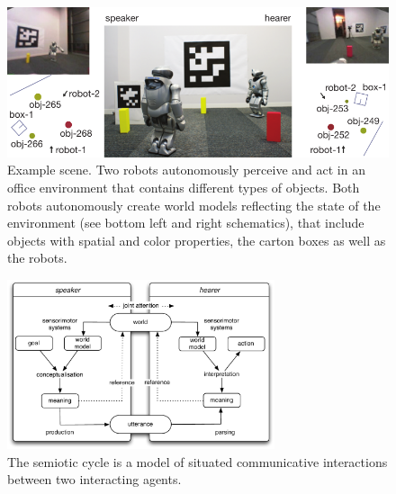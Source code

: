 \begin{figure}
	\begin{center}
		\includegraphics[width=1.0\columnwidth]{figs/space-scene-2-small}
	\end{center}
	\caption[Example spatial setup]{Example scene. 
		Two robots autonomously perceive and act in an office 
		environment that contains different types of objects. Both 
		robots autonomously create world models reflecting the state 
		of the environment (see bottom left and right schematics), that 
		include objects with spatial and color properties, the carton boxes 
		as well as the robots.}
	\label{f:scene}
\end{figure}
\begin{figure}
\begin{center}
\includegraphics[width=0.7\textwidth]{figs/semiotic-cycle}
\caption[Semiotic cycle]{The semiotic cycle is a model of situated communicative interactions between 
two interacting agents.}
\end{center}
\label{f:semiotic-cycle}
\end{figure}

